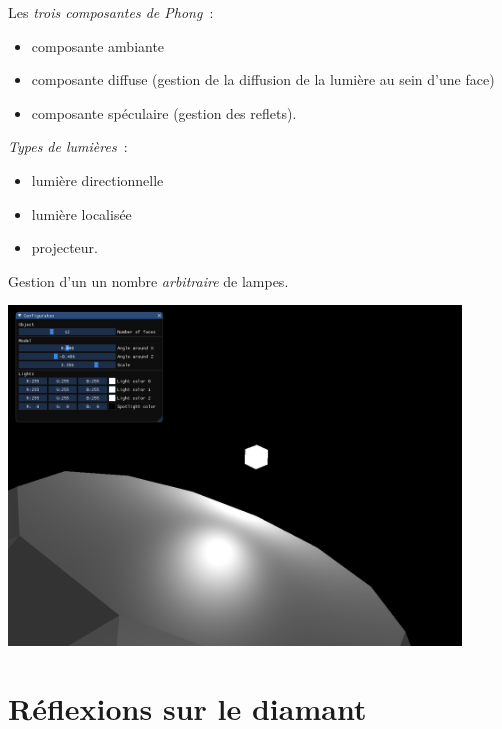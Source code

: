 \documentclass[11pt]{beamer}
\begin{document}
\begin{frame}
    Les \emph{trois composantes de Phong}~:
    \begin{itemize}
        \item composante ambiante
        \item composante diffuse (gestion de la diffusion de la lumière au sein d'une face)
        \item composante spéculaire (gestion des reflets).
    \end{itemize}

    \vfill

    \emph{Types de lumières}~:
    \begin{itemize}
        \item lumière directionnelle
        \item lumière localisée
        \item projecteur.
    \end{itemize}

    \vfill

    Gestion d'un un nombre \emph{arbitraire} de lampes.
\end{frame}

\begin{frame}
    {\centering \includegraphics[width=0.9\textwidth]{screenshot_software_3}}
\end{frame}

\section{Réflexions sur le diamant}
\end{document}
